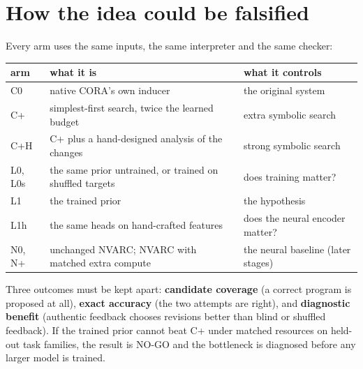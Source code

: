 \documentclass[11pt, a4paper]{article}
\begin{document}
\section{How the idea could be falsified}
\label{sec-falsify}
Every arm uses the same inputs, the same interpreter and the same checker:

\begin{center}
\begin{tabularx}{\linewidth}{lYY}
arm & what it is & what it controls\\[0pt]
\hline
C0 & native CORA's own inducer & the original system\\[0pt]
C+ & simplest-first search, twice the learned budget & extra symbolic search\\[0pt]
C+H & C+ plus a hand-designed analysis of the changes & strong symbolic search\\[0pt]
L0, L0s & the same prior untrained, or trained on shuffled targets & does training matter?\\[0pt]
L1 & the trained prior & the hypothesis\\[0pt]
L1h & the same heads on hand-crafted features & does the neural encoder matter?\\[0pt]
N0, N+ & unchanged NVARC; NVARC with matched extra compute & the neural baseline (later stages)\\[0pt]
\end{tabularx}
\end{center}

Three outcomes must be kept apart: \textbf{candidate coverage} (a correct program is proposed at all), \textbf{exact accuracy} (the two
attempts are right), and \textbf{diagnostic benefit} (authentic feedback chooses revisions better than blind or shuffled
feedback). If the trained prior cannot beat C+ under matched resources on held-out task families, the result is NO-GO
and the bottleneck is diagnosed before any larger model is trained.
\end{document}
